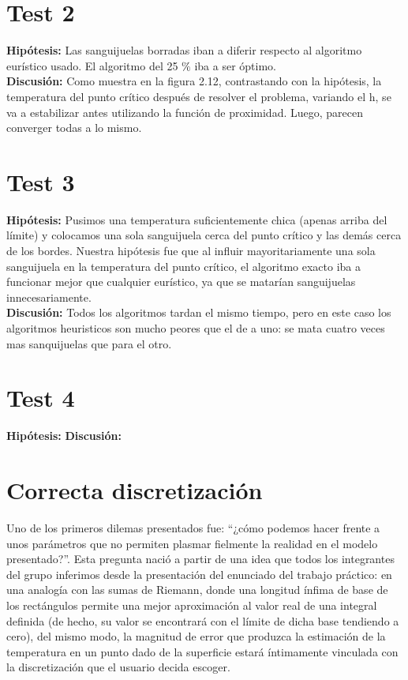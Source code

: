 \documentclass[double, 1.5in, 12pt]{beavtex}
\begin{document}
\section{Test 2}
\textbf{Hip\'otesis:}  Las sanguijuelas borradas iban a diferir respecto al algoritmo eur\'istico usado. El algoritmo del 25 $\%$ iba a ser \'optimo. \\
\textbf{Discusi\'on:} Como muestra en la figura 2.12, contrastando con la hip\'otesis, la temperatura del punto cr\'itico despu\'es de resolver el problema, variando el h, se va a estabilizar antes utilizando la funci\'on de proximidad. Luego, parecen converger todas a lo mismo.\\

\section{Test 3}
\textbf{Hip\'otesis:} Pusimos una temperatura suficientemente chica (apenas arriba del l\'imite) y colocamos una sola sanguijuela cerca del punto cr\'itico y las dem\'as cerca de los bordes. Nuestra hip\'otesis fue que al influir mayoritariamente una sola sanguijuela en la temperatura del punto cr\'itico, el algoritmo exacto iba a funcionar mejor que cualquier eur\'istico, ya que se matar\'ian sanguijuelas innecesariamente. \\
\textbf{Discusi\'on:} Todos los algoritmos tardan el mismo tiempo, pero en este caso los algoritmos heuristicos son mucho peores que el de a uno: se mata cuatro veces mas sanquijuelas que para el otro. \\

\section{Test 4}
\textbf{Hip\'otesis:}
\textbf{Discusi\'on:}
\section{Correcta discretizaci\'on}

Uno de los primeros dilemas presentados fue: “¿c\'omo podemos hacer frente a unos par\'ametros que no permiten plasmar fielmente la realidad en el modelo presentado?”.  Esta pregunta naci\'o a partir de una idea que todos los integrantes del grupo inferimos  desde la presentaci\'on del enunciado del trabajo pr\'actico: en una analog\'ia con las sumas de Riemann, donde una longitud \'infima de base de los rect\'angulos permite una mejor aproximaci\'on al valor real de una integral definida (de hecho, su valor se encontrar\'a con el l\'imite de dicha base tendiendo a cero), del mismo modo, la magnitud de error que produzca la estimaci\'on de la temperatura en un punto dado de la superficie estar\'a \'intimamente vinculada con la discretizaci\'on que el usuario decida escoger.  \\
\end{document}

